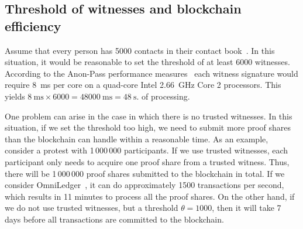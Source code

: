 


\subsection{Threshold of witnesses and blockchain efficiency}

Assume that every person has 5000 contacts in their contact book~\cite{DifficultyOfPrivateContactDiscovery}.
In this situation, it would be reasonable to set the threshold of at least 6000 witnesses.
According to the Anon-Pass performance measures~\cite{AnonPass} each witness signature would require \SI{8}{\milli\second} per core on a quad-core Intel \SI{2.66}{\giga\hertz} Core 2 processors.
This yields \(
  \SI{8}{\milli\second}\times 6000 = \SI{48000}{\milli\second} = 
  \SI{48}{\second}.
\) of processing.


One problem can arise in the case in which there is no trusted witnesses.
In this situation, if we set the threshold too high, we need to submit more proof shares than the blockchain can handle within a reasonable time.
As an example, consider a protest with 1\,000\,000 participants.
If we use trusted witnesses, each participant only needs to acquire one proof share from a trusted witness.
Thus, there will be 1\,000\,000 proof shares submitted to the blockchain in total.
If we consider OmniLedger~\cite{OmniLedger}, it can do approximately 1500 transactions per second, which results in 11 minutes to process all the proof shares.
On the other hand, if we do not use trusted witnesses, but a threshold \(\theta = 1000\), then it will take 7 days before all transactions are committed to the blockchain.


 
